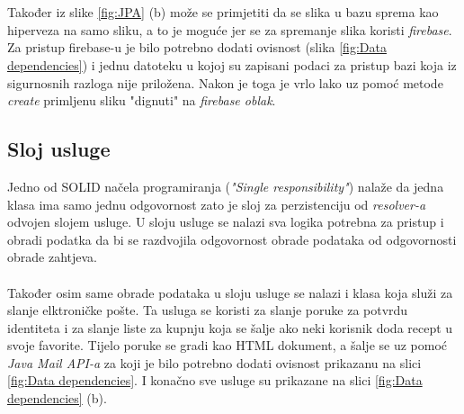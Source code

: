 \documentclass[times, utf8, zavrsni]{fer}
\begin{document}
\\\\
Također iz slike \ref{fig:JPA} (b) može se primjetiti da se slika u bazu sprema kao hiperveza na samo sliku, a to je moguće jer se za
spremanje slika koristi \textit{firebase}. Za pristup firebase-u je bilo potrebno dodati ovisnost (slika \ref{fig:Data dependencies}) i jednu datoteku u kojoj su zapisani
podaci za pristup bazi koja iz sigurnosnih razloga nije priložena. Nakon je toga je vrlo lako uz pomoć metode \textit{create} primljenu
sliku "dignuti" na \textit{firebase oblak}.

\subsection{Sloj usluge}
Jedno od SOLID načela programiranja (\textit{"Single responsibility"}) nalaže da jedna klasa ima samo jednu odgovornost
zato je sloj za perzistenciju od \textit{resolver-a} odvojen slojem usluge. U sloju usluge se nalazi sva logika
potrebna za pristup i obradi podatka da bi se razdvojila odgovornost obrade podataka od odgovornosti obrade zahtjeva.
\\\\
Također osim same obrade podataka u sloju usluge se nalazi i klasa koja služi za slanje elktroničke pošte.
Ta usluga se koristi za slanje poruke za potvrdu identiteta i za slanje liste za kupnju
koja se šalje ako neki korisnik doda recept u svoje favorite. Tijelo poruke se gradi
kao HTML dokument, a šalje se uz pomoć \textit{Java Mail API-a} za koji je bilo potrebno dodati ovisnost
prikazanu na slici \ref{fig:Data dependencies}. I konačno sve usluge su prikazane na slici \ref{fig:Data dependencies} (b).
\end{document}
